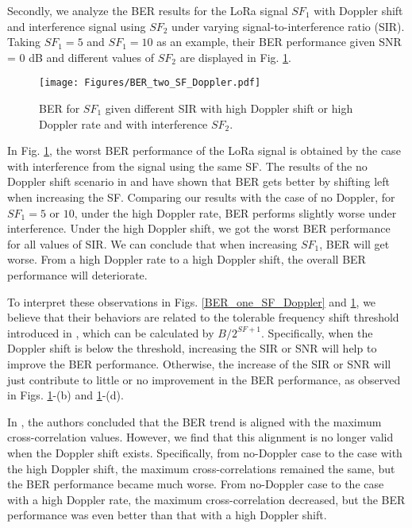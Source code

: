 \documentclass{IEEEtaes}
\theoremstyle{plain}
\begin{document}
Secondly, we analyze the BER results for the LoRa signal $SF_1$ with Doppler shift and interference signal using $SF_2$ under varying signal-to-interference ratio (SIR). Taking $SF_1= 5$ and $SF_1= 10$ as an example, their BER performance given SNR = $0$ dB and different values of $SF_2$ are displayed in Fig. \ref{BER_two_SF_Doppler}. 
\begin{figure}[ht]
  \centering
  \texttt{[image: Figures/BER\_two\_SF\_Doppler.pdf]}
  \caption{BER for $SF_1$ given different SIR with high Doppler shift or high Doppler rate and with interference $SF_2$.}
  \label{BER_two_SF_Doppler}
\end{figure}

In Fig. \ref{BER_two_SF_Doppler}, the worst BER performance of the LoRa signal is obtained by the case with interference from the signal using the same SF. The results of the no Doppler shift scenario in \cite{benkhelifa2022orthogonal} and \cite{al2021iot} have shown that BER gets better by shifting left when increasing the SF.
Comparing our results with the case of no Doppler, for $SF_1 = 5$ or $10$, under the high Doppler rate, BER performs slightly worse under interference. 
Under the high Doppler shift, we got the worst BER performance for all values of SIR. 
We can conclude that when increasing $SF_1$, BER will get worse. 
From a high Doppler rate to a high Doppler shift, the overall BER performance will deteriorate. 

To interpret these observations in Figs. \ref{BER_one_SF_Doppler} and \ref{BER_two_SF_Doppler}, we believe that their behaviors are related to the tolerable frequency shift threshold introduced in \cite{cao2021influence,ben2022new}, which can be calculated by $B/{2^{SF+1}}$.
Specifically, when the Doppler shift is below the threshold, increasing the SIR or SNR will help to improve the BER performance. Otherwise, the increase of the SIR or SNR will just contribute to little or no improvement in the BER performance, as observed in Figs. \ref{BER_two_SF_Doppler}-(b) and \ref{BER_two_SF_Doppler}-(d).

In \cite{benkhelifa2022orthogonal}, the authors concluded that the BER trend is aligned with the maximum cross-correlation values. However, we find that this alignment is no longer valid when the Doppler shift exists. Specifically, from no-Doppler case to the case with the high Doppler shift, the maximum cross-correlations remained the same, but the BER performance became much worse. From no-Doppler case to the case with a high Doppler rate, the maximum cross-correlation decreased, but the BER performance was even better than that with a high Doppler shift. %
\end{document}
